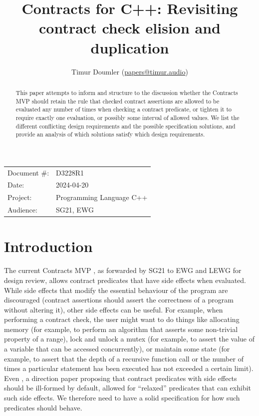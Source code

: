 

 \usepackage[bottom]{footmisc} 

 \usepackage{longtable}



\title{Contracts for C++: Revisiting contract check elision and duplication}
\author{ Timur Doumler \small(\href{mailto:papers@timur.audio}{papers@timur.audio}) 
}
\date{}
\maketitle

\begin{tabular}{ll}
Document \#: & D3228R1 \\
Date: &2024-04-20 \\
Project: & Programming Language C++ \\
Audience: & SG21, EWG
\end{tabular}

\begin{abstract}
This paper attempts to inform and structure to the discussion whether the Contracts MVP should retain the rule that checked contract assertions are allowed to be evaluated any number of times when checking a contract predicate, or tighten it to require exactly one evaluation, or possibly some interval of allowed values. We list the different conflicting design requirements and the possible specification solutions, and provide an analysis of which solutions satisfy which design requirements.
\end{abstract}


\section{Introduction}
\label{sec:intro}

The current Contracts MVP \cite{P2900R6}, as forwarded by SG21 to EWG and LEWG for design review, allows contract predicates that have side effects when evaluated. While side effects that modify the essential behaviour of the program are discouraged (contract assertions should assert the correctness of a program without altering it), other side effects can be useful. For example, when performing a contract check, the user might want to do things like allocating memory (for example, to perform an algorithm that asserts some non-trivial property of a range), lock and unlock a mutex (for example, to assert the value of a variable that can be accessed concurrently), or maintain some state (for example, to assert that the depth of a recursive function call or the number of times a particular statement has been executed has not exceeded a certain limit). Even \cite{P2680R1}, a direction paper proposing that contract predicates with side effects should be ill-formed by default, allowed for ``relaxed'' predicates that can exhibit such side effects. We therefore need to have a solid specification for how such predicates should behave.

